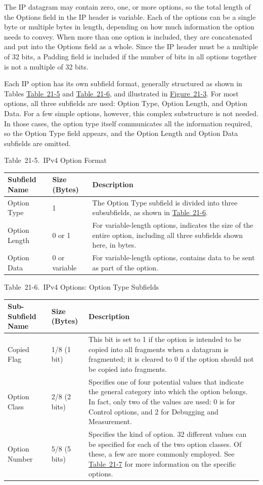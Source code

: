The IP datagram may contain zero, one, or more options, so the total
length of the Options field in the IP header is variable. Each of the
options can be a single byte or multiple bytes in length, depending on
how much information the option needs to convey. When more than one
option is included, they are concatenated and put into the Options field
as a whole. Since the IP header must be a multiple of 32 bits, a Padding
field is included if the number of bits in all options together is not a
multiple of 32 bits.

Each IP option has its own subfield format, generally structured as
shown in Tables
\protect\hyperlink{ch21s03.htmlux5cux23ipv_option_format}{Table~21-5}
and
\protect\hyperlink{ch21s03.htmlux5cux23ipv_options_option_type_subfields}{Table~21-6},
and illustrated in
\protect\hyperlink{ch21s03.htmlux5cux23ipv4_options_field_format_this_diagram_s}{Figure~21-3}.
For most options, all three subfields are used: Option
Type,
Option Length, and Option Data. For a few simple options, however, this
complex substructure is not needed. In those cases, the option type
itself communicates all the information required, so the Option Type
field appears, and the Option Length and Option Data subfields are
omitted.



Table~21-5.~IPv4 Option Format

\begin{longtable}[]{@{}lll@{}}
\toprule
Subfield Name & Size (Bytes) & Description\tabularnewline
\midrule
\endhead
Option Type & 1 & The Option Type subfield is divided into three
subsubfields, as shown in
\protect\hyperlink{ch21s03.htmlux5cux23ipv_options_option_type_subfields}{Table~21-6}.\tabularnewline
Option Length & 0 or 1 & For variable-length
options,
indicates the size of the entire option, including all three subfields
shown here, in bytes.\tabularnewline
Option Data & 0 or variable & For variable-length
options,
contains data to be sent as part of the option.\tabularnewline
\bottomrule
\end{longtable}



Table~21-6.~IPv4 Options: Option Type Subfields

\begin{longtable}[]{@{}lll@{}}
\toprule
Sub-Subfield Name & Size (Bytes) & Description\tabularnewline
\midrule
\endhead
Copied Flag & 1/8 (1 bit) & This bit is set to 1 if the option is
intended to be copied into all fragments when a datagram is fragmented;
it is cleared to 0 if the option should not be copied into
fragments.\tabularnewline
Option Class & 2/8 (2 bits) & Specifies one of four potential values
that indicate the general category into which the option belongs. In
fact, only two of the values are used: 0 is for Control options, and 2
for Debugging and Measurement.\tabularnewline
Option Number & 5/8 (5 bits) & Specifies the kind of option. 32
different values can be specified for each of the two option classes. Of
these, a few are more commonly employed. See
\protect\hyperlink{ch21s03.htmlux5cux23common_ipv_options}{Table~21-7}
for more information on the specific options.\tabularnewline
\bottomrule
\end{longtable}

